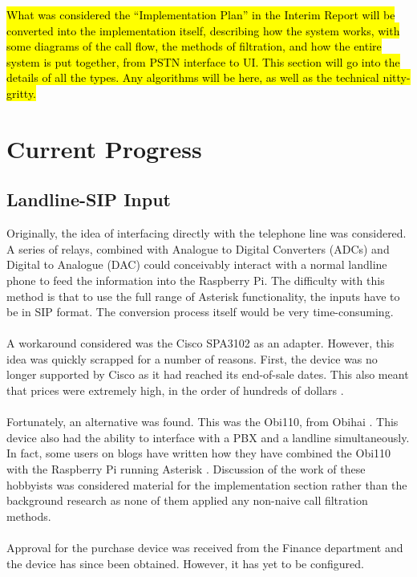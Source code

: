 \documentclass[main.tex]{subfiles}
\begin{document}
\hl{What was considered the ``Implementation Plan'' in the Interim Report will be converted into the implementation itself, describing how the system works, with some diagrams of the call flow, the methods of filtration, and how the entire system is put together, from PSTN interface to UI. This section will go into the details of all the types. Any algorithms will be here, as well as the technical nitty-gritty. }

\section{Current Progress}
\subsection{Landline-SIP Input}
Originally, the idea of interfacing directly with the telephone line was considered. A series of relays, combined with Analogue to Digital Converters (ADCs) and Digital to Analogue (DAC) could conceivably interact with a normal landline phone to feed the information into the Raspberry Pi. The difficulty with this method is that to use the full range of Asterisk functionality, the inputs have to be in SIP format. The conversion process itself would be very time-consuming.
\\\\
A workaround considered was the Cisco SPA3102 \cite{spa3102-specs} as an adapter. However, this idea was quickly scrapped for a number of reasons. First, the device was no longer supported by Cisco as it had reached its end-of-sale dates. This also meant that prices were extremely high, in the order of hundreds of dollars \cite{spa3102-amazon}.
\\\\
Fortunately, an alternative was found. This was the Obi110, from Obihai \cite{obi110-specs}. This device also had the ability to interface with a PBX and a landline simultaneously. In fact, some users on blogs have written how they have combined the Obi110 with the Raspberry Pi running Asterisk \cite{freepbx} \cite{bryanross}. Discussion of the work of these hobbyists was considered material for the implementation section rather than the background research as none of them applied any non-naive call filtration methods.
\\\\
Approval for the purchase device was received from the Finance department and the device has since been obtained. However, it has yet to be configured.
\end{document}
